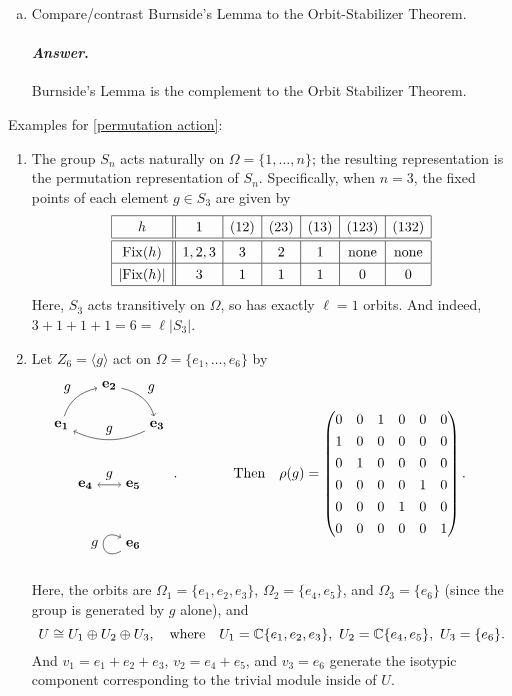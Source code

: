 \documentclass[11pt, reqno]{amsart}
\theoremstyle{plain}
\theoremstyle{definition}
\theoremstyle{example}
\newenvironment{ans}{\medskip \paragraph*{\emph{Answer}.}}{\hfill \break  $~\!\!$ \dotfill \medskip }
\newcommand\TikZ[1]{\begin{matrix}\begin{tikzpicture}#1\end{tikzpicture}\end{matrix}}
\def\<{\langle} \def\>{\rangle}
\def\Fix{\mathrm{Fix}}
\begin{document}
\begin{enumerate}[I ]
\begin{enumerate}[1.]
\begin{enumerate}[(a)]
\begin{proof}
\end{proof}
\item Compare/contrast Burnside's Lemma to the Orbit-Stabilizer Theorem.
\begin{ans}
Burnside's Lemma is the complement to the Orbit Stabilizer Theorem.
\end{ans}
\end{enumerate}
\end{enumerate}
\end{enumerate}

\vfill
\pagebreak

Examples for \ref{permutation action}: 
\begin{enumerate}
\item The group $S_n$ acts naturally on $\Omega = \{1, \dots, n\}$; the resulting representation is the permutation representation of $S_n$. Specifically, when $n = 3$, the fixed points of each element $g \in S_3$ are given by 
$$\def\arraystretch{1.3}\begin{array}{|c||c|c|c|c|c|c|}\hline
h & 1 & (12) & (23) & (13) & (123) & (132) \\\hline\hline
\Fix(h) &1,2,3 & 3 & 2 & 1 & \text{none}& \text{none}\\\hline
|\Fix(h)| & 3 & 1 & 1 & 1 & 0 & 0\\\hline
\end{array}$$
Here, $S_3$ acts transitively on $\Omega$, so has exactly $\ell = 1$ orbits. And indeed, $3 + 1 + 1 + 1 = 6 = \ell|S_3|$. 

\item Let $Z_6 = \<g\>$ act on $\Omega = \{e_1, \dots,  e_6\}$ by 
$$\TikZ{[xscale=1.2] \foreach \x/\y in {1/0,2/1,3/0}{\node (\x) at (\x,\y) {$\mathbf{e_\x}$};} 
	\draw[->] (1) to [bend left] node[above left]{$g$} (2);
	\draw[->] (2) to [bend left] node[above right]{$g$} (3);
	\draw[->] (3) to [bend left] node[above]{$g$} (1);
	\foreach \x/\y in {4/1.5, 5/2.5}{\node (\x) at (\y,-1.5) {$\mathbf{e_\x}$};} 
	\draw[<->] (4) to node[above]{$g$} (5); 
	\node (6) at (2.5,-3) {$\mathbf{e_6}$}; \draw[->] (6) ..  controls +(-.75,-.5) and +(-.75,.5) .. node[left]{$g$}(6);
	}\ .
\qquad\qquad\text{Then} \quad  \rho(g) = \begin{pmatrix} 0 & 0 & 1 & 0& 0& 0\\1 & 0 & 0& 0& 0& 0\\0&1&0& 0& 0& 0\\0 & 0 & 0 & 0 & 1& 0\\ 0 & 0 & 0 & 1 & 0 & 0 \\ 0 & 0 & 0 & 0 & 0 & 1\end{pmatrix}. \qquad
$$
Here, the orbits are $\Omega_1 = \{e_1, e_2, e_3\}$, $\Omega_2 = \{e_4, e_5\}$, and $\Omega_3 = \{e_6\}$ (since the group is generated by $g$ alone), and 
$$U \cong U_1 \oplus U_2 \oplus U_3, \quad \text{where} \quad U_1=\mathbb{C}\{e_1, e_2, e_3\},\ U_2=\mathbb{C}\{e_4, e_5\},\ U_3 = \{e_6\}.$$
And $v_1 = e_1 + e_2 + e_3$, $v_2 = e_4 + e_5$, and $v_3 = e_6$ generate the isotypic component corresponding to the trivial module inside of $U$. 


\end{enumerate}
\end{document}
